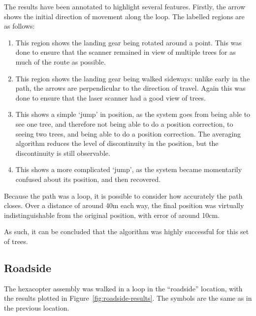 \documentclass[12pt,oneside,a4paper]{book}
\begin{document}
The results have been annotated to highlight several
features. Firstly, the arrow shows the initial direction of movement
along the loop. The labelled regions are as follows:
\begin{enumerate}[A:]
\item This region shows the landing gear being rotated around a
  point. This was done to ensure that the scanner remained in view of
  multiple trees for as much of the route as possible.
\item This region shows the landing gear being walked sideways: unlike
  early in the path, the arrows are perpendicular to the direction of
  travel. Again this was done to ensure that the laser scanner had a
  good view of trees.
\item This shows a simple `jump' in position, as the system goes from
  being able to see one tree, and therefore not being able to do a
  position correction, to seeing two trees, and being able to do a
  position correction. The averaging algorithm reduces the level of
  discontinuity in the position, but the discontinuity is still
  observable.
\item This shows a more complicated `jump', as the system became
  momentarily confused about its position, and then recovered.
\end{enumerate}

Because the path was a loop, it is possible to consider how accurately the path
closes. Over a distance of around 40m each way, the final position was
virtually indistinguishable from the original position, with error of
around 10cm.

As such, it can be concluded that the algorithm was highly successful for
this set of trees.

\subsection{Roadside}
\label{sec:roadside}

The hexacopter assembly was walked in a loop in the ``roadside''
location, with the results plotted in
Figure~\ref{fig:roadside-results}. The symbols are the same as in the
previous location.
\end{document}
